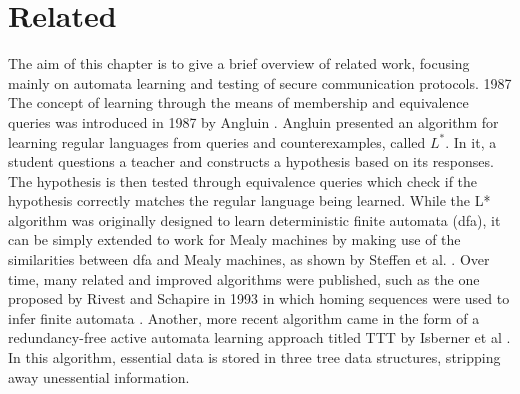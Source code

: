 %
%
% 
% 
% 

\chapter{Related}

\label{chap:Related}
The aim of this chapter is to give a brief overview of related work, focusing mainly on automata learning and testing of secure communication protocols.
1987 
The concept of learning through the means of membership and equivalence queries was introduced in 1987 by Angluin \parencite{angluin1987learning}. Angluin presented an algorithm for learning regular languages from queries and counterexamples, called $L^*$. In it, a student questions a teacher and constructs a hypothesis based on its responses. The hypothesis is then tested through equivalence queries which check if the hypothesis correctly matches the regular language being learned. While the L* algorithm was originally designed to learn deterministic finite automata (dfa), it can be simply extended to work for Mealy machines by making use of the similarities between dfa and Mealy machines, as shown by Steffen et al. \parencite{steffen2011}. Over time, many related and improved algorithms were published, such as the one proposed by Rivest and Schapire in 1993 in which homing sequences were used to infer finite automata \parencite{Rivest1993Inference}. Another, more recent algorithm came in the form of a redundancy-free active automata learning approach titled TTT by Isberner et al \parencite{Isberner2014TTT}. In this algorithm, essential data is stored in three tree data structures, stripping away unessential information. %

